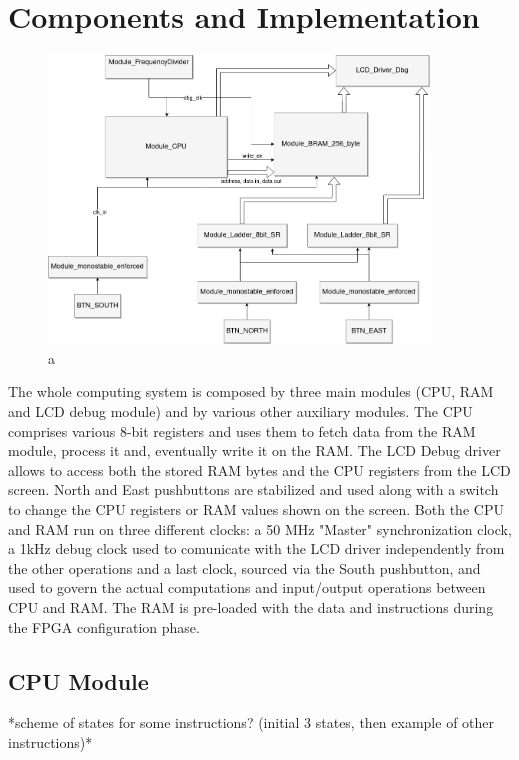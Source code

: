 \section{Components and Implementation} \label{sec:impl}

\begin{figure}[hbtp]
    \centering
    \includegraphics[width=0.9\textwidth]{img/System.png}
    \caption{a}
    \label{fig:diagram}
\end{figure}

The whole computing system is composed by three main modules (CPU, RAM and LCD debug module)
and by various other auxiliary modules.
The CPU comprises various 8-bit registers and uses them to fetch data from the RAM module, process it and, eventually write it on the RAM.
The LCD Debug driver allows to access both the stored RAM bytes and the CPU registers from the LCD screen.
North and East pushbuttons are stabilized and used along with a switch to change the CPU registers or RAM values shown on the screen.
Both the CPU and RAM run on three different clocks: a 50 MHz "Master" synchronization clock,
 a 1kHz debug clock used to comunicate with the LCD driver independently from the other operations
 and a last clock, sourced via the South pushbutton, and used to govern the actual computations and input/output operations between CPU and RAM.
The RAM is pre-loaded with the data and instructions during the FPGA configuration phase.



\subsection{CPU Module}  \label{ssec:cpu}
*scheme of states for some instructions? (initial 3 states, then example of other instructions)*

